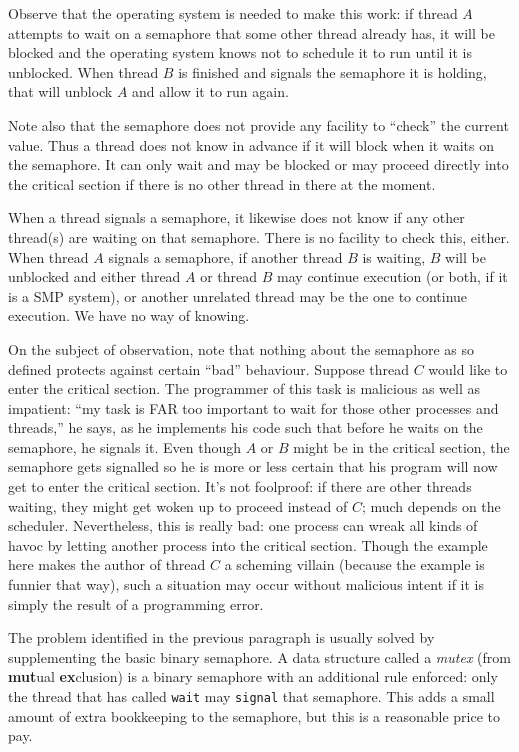 Observe that the operating system is needed to make this work: if thread $A$ attempts to wait on a semaphore that some other thread already has, it will be blocked and the operating system knows not to schedule it to run until it is unblocked. When thread $B$ is finished and signals the semaphore it is holding, that will unblock $A$ and allow it to run again.

Note also that the semaphore does not provide any facility to ``check'' the current value. Thus a thread does not know in advance if it will block when it waits on the semaphore. It can only wait and may be blocked or may proceed directly into the critical section if there is no other thread in there at the moment.

When a thread signals a semaphore, it likewise does not know if any other thread(s) are waiting on that semaphore. There is no facility to check this, either. When thread $A$ signals a semaphore, if another thread $B$ is waiting, $B$ will be unblocked and either thread $A$ or thread $B$ may continue execution (or both, if it is a SMP system), or another unrelated thread may be the one to continue execution. We have no way of knowing.

On the subject of observation, note that nothing about the semaphore as so defined protects against certain ``bad'' behaviour. Suppose thread $C$ would like to enter the critical section. The programmer of this task is malicious as well as impatient: ``my task is FAR too important to wait for those other processes and threads,'' he says, as he implements his code such that before he waits on the semaphore, he signals it. Even though $A$ or $B$ might be in the critical section, the semaphore gets signalled so he is more or less certain that his program will now get to enter the critical section. It's not foolproof: if there are other threads waiting, they might get woken up to proceed instead of $C$; much depends on the scheduler. Nevertheless, this is really bad: one process can wreak all kinds of havoc by letting another process into the critical section. Though the example here makes the author of thread $C$ a scheming villain (because the example is funnier that way), such a situation may occur without malicious intent if it is simply the result of a programming error.

The problem identified in the previous paragraph is usually solved by supplementing the basic binary semaphore. A data structure called a \textit{mutex} (from \textbf{mut}ual \textbf{ex}clusion) is a binary semaphore with an additional rule enforced: only the thread that has called \texttt{wait} may \texttt{signal} that semaphore. This adds a small amount of extra bookkeeping to the semaphore, but this is a reasonable price to pay.

